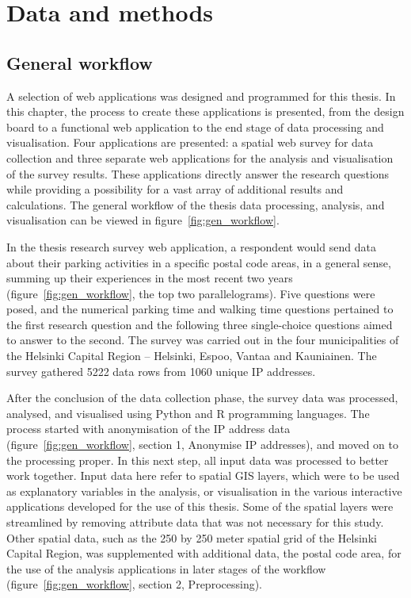 \section{Data and methods}
\label{sec:c3-data} %
\subsection{General workflow}
\justify

A selection of web applications was designed and programmed for this thesis. In this chapter, the process to create these applications is presented, from the design board to a functional web application to the end stage of data processing and visualisation. Four applications are presented: a spatial web survey for data collection and three separate web applications for the analysis and visualisation of the survey results. These applications directly answer the research questions while providing a possibility for a vast array of additional results and calculations. The general workflow of the thesis data processing, analysis, and visualisation can be viewed in figure~\ref{fig:gen_workflow}.

In the thesis research survey web application, a respondent would send data about their parking activities in a specific postal code areas, in a general sense, summing up their experiences in the most recent two years (figure~\ref{fig:gen_workflow}, the top two parallelograms). Five questions were posed, and the numerical parking time and walking time questions pertained to the first research question and the following three single-choice questions aimed to answer to the second. The survey was carried out in the four municipalities of the Helsinki Capital Region -- Helsinki, Espoo, Vantaa and Kauniainen. The survey gathered 5222 data rows from 1060 unique IP addresses. 

After the conclusion of the data collection phase, the survey data was processed, analysed, and visualised using Python and R programming languages. The process started with anonymisation of the IP address data (figure~\ref{fig:gen_workflow}, section 1, Anonymise IP addresses), and moved on to the processing proper. In this next step, all input data was processed to better work together. Input data here refer to spatial GIS layers, which were to be used as explanatory variables in the analysis, or visualisation in the various interactive applications developed for the use of this thesis. Some of the spatial layers were streamlined by removing attribute data that was not necessary for this study. Other spatial data, such as the 250 by 250 meter spatial grid of the Helsinki Capital Region, was supplemented with additional data, the postal code area, for the use of the analysis applications in later stages of the workflow (figure~\ref{fig:gen_workflow}, section 2, Preprocessing).

